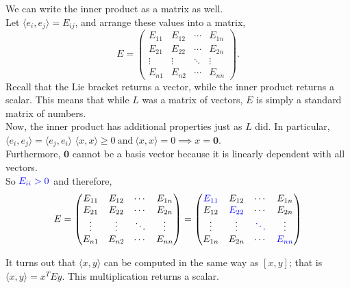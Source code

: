 \documentclass[11 pt]{article}
\newcommand{\br}[2]{\left[#1,#2\right]}
\newcommand{\inp}[2]{\langle #1, #2 \rangle}
\newcommand{\zvec}{\mathbf{0}}
\newcommand{\blu}[1]{{\color{blue} #1}}
\begin{document}
    We can write the inner product as a matrix as well.
    \\Let $\inp{e_i}{e_j} = E_{ij}$, and arrange these values into a matrix,
    $$
        E = \begin{pmatrix}
                E_{11} & E_{12} & \cdots & E_{1n} \\
                E_{21} & E_{22} & \cdots & E_{2n} \\
                \vdots & \vdots & \ddots & \vdots \\
                E_{n1} & E_{n2} & \cdots & E_{nn}
            \end{pmatrix}.
    $$
    Recall that the Lie bracket returns a vector, while the inner product
    returns a scalar. This means that while $L$ was a matrix of vectors,
    $E$ is simply a standard matrix of numbers.
    \\Now, the inner product has additional properties just as $L$ did. In particular,
    \\$\inp{e_i}{e_j} = \inp{e_j}{e_i}$
    $\inp{x}{x} \ge 0 \ \text{and} \ \inp{x}{x}=0 \implies x=\zvec$.
    \\Furthermore, $\zvec$ cannot be a basis vector because it is linearly dependent with all vectors.
    \\So $\blu{E_{ii}>0}$ and therefore,
    $$
        E = \begin{pmatrix}
                E_{11} & E_{12} & \cdots & E_{1n} \\
                E_{21} & E_{22} & \cdots & E_{2n} \\
                \vdots & \vdots & \ddots & \vdots \\
                E_{n1} & E_{n2} & \cdots & E_{nn}
            \end{pmatrix}
          = \begin{pmatrix}
            \blu{E_{11}} & E_{12} & \cdots & E_{1n} \\
            E_{12} & \blu{E_{22}} & \cdots & E_{2n} \\
            \vdots & \vdots & \blu{\ddots} & \vdots \\
            E_{1n} & E_{2n} & \cdots & \blu{E_{nn}}
            \end{pmatrix}
    $$

    It turns out that $\inp{x}{y}$ can be computed in the same way as
    $\br{x}{y}$; that is $\inp{x}{y} = x^{T}Ey$. This multiplication returns a
    scalar.
\end{document}
